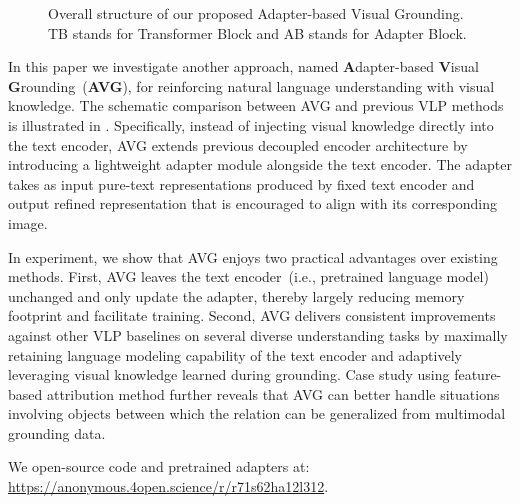 \begin{figure}[t!]
	\centering
	\caption{Overall structure of our proposed Adapter-based Visual Grounding. TB stands for Transformer Block and AB stands for Adapter Block.} \label{fig:overview}
\end{figure}

In this paper we investigate another approach, named \textbf{A}dapter-based \textbf{V}isual \textbf{G}rounding~(\textbf{AVG}), for reinforcing natural language understanding with visual knowledge. The schematic comparison between AVG and previous VLP methods is illustrated in . Specifically, instead of injecting visual knowledge directly into the text encoder, AVG extends previous decoupled encoder architecture by introducing a lightweight adapter module alongside the text encoder. The adapter takes as input pure-text representations produced by fixed text encoder and output refined representation that is encouraged to align with its corresponding image.


In experiment, we show that AVG enjoys two practical advantages over existing methods. 
First, AVG leaves the text encoder~(i.e., pretrained language model) unchanged and only 
update the adapter, thereby largely reducing memory footprint and facilitate training. Second, AVG delivers consistent improvements against other VLP baselines on several 
diverse understanding tasks by maximally retaining language modeling capability of the 
text encoder and adaptively leveraging visual knowledge learned during grounding. 
Case study using feature-based attribution method further reveals that AVG can better 
handle situations involving objects between which the relation can be generalized from 
multimodal grounding data.

We open-source code and pretrained adapters at: \url{https://anonymous.4open.science/r/r71s62ha12l312}.
